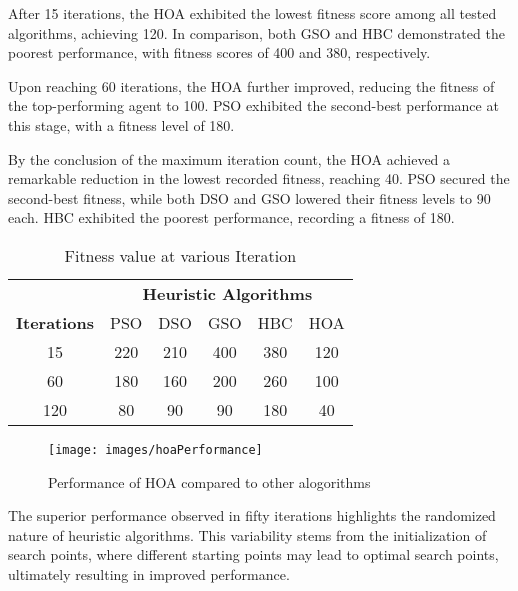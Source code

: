 \documentclass[conference]{IEEEtran}
\begin{document}
\begin{abstract1}
After 15 iterations, the HOA exhibited the lowest fitness score among all tested algorithms, achieving 120. In comparison, both GSO and HBC demonstrated the poorest performance, with fitness scores of 400 and 380, respectively.

Upon reaching 60 iterations, the HOA further improved, reducing the fitness of the top-performing agent to 100. PSO exhibited the second-best performance at this stage, with a fitness level of 180.

By the conclusion of the maximum iteration count, the HOA achieved a remarkable reduction in the lowest recorded fitness, reaching 40. PSO secured the second-best fitness, while both DSO and GSO lowered their fitness levels to 90 each. HBC exhibited the poorest performance, recording a fitness of 180.
 

 
 
   \begin{table}[h]
 	\caption{Fitness value at various Iteration}
 	\begin{center}
 		\begin{tabular}{|c|c|c|c|c|c|}
 			\hline
 			& \multicolumn{5}{c|}{\textbf{Heuristic Algorithms}}\\
 			\textbf{Iterations} & PSO &  DSO   & GSO & HBC & HOA \\ \hline
 		15 & 220 & 210  & 400 & 380 & 120\\ \hline
 		60 & 180 &  160  &  200 & 260 & 100\\ \hline
 		120 & 80 &  90 &  90 & 180 & 40\\ \hline
 		
 			
 			
 		\end{tabular}
 		\label{tabCVRPParad}
 	\end{center}
 \end{table}


 
  \begin{figure}[!htb]
 	\centerline{\texttt{[image: images/hoaPerformance]}}
 	\caption{Performance of HOA compared to other alogorithms }
 	\label{fig:HoaPerformance}
 \end{figure}
 
 The superior performance observed in fifty iterations highlights the randomized nature of heuristic algorithms. This variability stems from the initialization of search points, where different starting points may lead to optimal search points, ultimately resulting in improved performance.
 

\end{abstract1}
\end{document}
